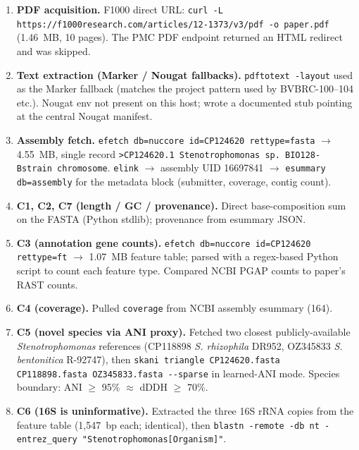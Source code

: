 \documentclass[11pt]{article}
\begin{document}
\begin{enumerate}
\item \textbf{PDF acquisition.} F1000 direct URL:
      \verb|curl -L https://f1000research.com/articles/12-1373/v3/pdf -o paper.pdf|
      (1.46~MB, 10 pages). The PMC PDF endpoint returned an HTML redirect and was skipped.

\item \textbf{Text extraction (Marker / Nougat fallbacks).} \texttt{pdftotext -layout} used
      as the Marker fallback (matches the project pattern used by BVBRC-100--104 etc.).
      Nougat env not present on this host; wrote a documented stub pointing at the
      central Nougat manifest.

\item \textbf{Assembly fetch.} \verb|efetch db=nuccore id=CP124620 rettype=fasta| $\to$
      4.55~MB, single record \verb|>CP124620.1 Stenotrophomonas sp. BIO128-Bstrain chromosome|.
      \verb|elink| $\to$ assembly UID 16697841 $\to$ \verb|esummary db=assembly| for the
      metadata block (submitter, coverage, contig count).

\item \textbf{C1, C2, C7 (length / GC / provenance).} Direct base-composition sum on the
      FASTA (Python stdlib); provenance from esummary JSON.

\item \textbf{C3 (annotation gene counts).} \verb|efetch db=nuccore id=CP124620 rettype=ft|
      $\to$ 1.07~MB feature table; parsed with a regex-based Python script to count each
      feature type. Compared NCBI PGAP counts to paper's RAST counts.

\item \textbf{C4 (coverage).} Pulled \verb|coverage| from NCBI assembly esummary (164).

\item \textbf{C5 (novel species via ANI proxy).} Fetched two closest publicly-available
      \emph{Stenotrophomonas} references (CP118898 \emph{S. rhizophila} DR952, OZ345833
      \emph{S. bentonitica} R-92747), then
      \verb|skani triangle CP124620.fasta CP118898.fasta OZ345833.fasta --sparse|
      in learned-ANI mode. Species boundary: ANI $\ge$ 95\% $\approx$ dDDH $\ge$ 70\%.

\item \textbf{C6 (16S is uninformative).} Extracted the three 16S rRNA copies from the
      feature table (1{,}547~bp each; identical), then
      \verb|blastn -remote -db nt -entrez_query "Stenotrophomonas[Organism]"|.
\end{enumerate}
\end{document}
